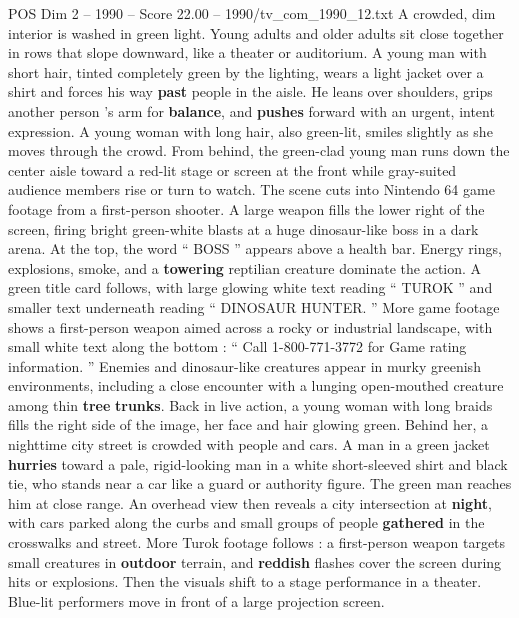 \begin{textsample}{POS Dim 2 – 1990 – Score 22.00 – 1990/tv\_com\_1990\_12.txt}  \label{ex:f2_pos_033}
A crowded, dim interior is washed in green light.
Young adults and older adults sit close together in rows that slope downward, like a theater or auditorium.
A young man with short hair, tinted completely green by the lighting, wears a light jacket over a shirt and forces his way \textbf{past} people in the aisle.
He leans over shoulders, grips another person ’s arm for \textbf{balance}, and \textbf{pushes} forward with an urgent, intent expression.
A young woman with long hair, also green-lit, smiles slightly as she moves through the crowd.
From behind, the green-clad young man runs down the center aisle toward a red-lit stage or screen at the front while gray-suited audience members rise or turn to watch.
The scene cuts into Nintendo 64 game footage from a first-person shooter.
A large weapon fills the lower right of the screen, firing bright green-white blasts at a huge dinosaur-like boss in a dark arena.
At the top, the word “ BOSS ” appears above a health bar.
Energy rings, explosions, smoke, and a \textbf{towering} reptilian creature dominate the action.
A green title card follows, with large glowing white text reading “ TUROK ” and smaller text underneath reading “ DINOSAUR HUNTER. ” More game footage shows a first-person weapon aimed across a rocky or industrial landscape, with small white text along the bottom : “ Call 1-800-771-3772 for Game rating information. ” Enemies and dinosaur-like creatures appear in murky greenish environments, including a close encounter with a lunging open-mouthed creature among thin \textbf{tree} \textbf{trunks}.
Back in live action, a young woman with long braids fills the right side of the image, her face and hair glowing green.
Behind her, a nighttime city street is crowded with people and cars.
A man in a green jacket \textbf{hurries} toward a pale, rigid-looking man in a white short-sleeved shirt and black tie, who stands near a car like a guard or authority figure.
The green man reaches him at close range.
An overhead view then reveals a city intersection at \textbf{night}, with cars parked along the curbs and small groups of people \textbf{gathered} in the crosswalks and street.
More Turok footage follows : a first-person weapon targets small creatures in \textbf{outdoor} terrain, and \textbf{reddish} flashes cover the screen during hits or explosions.
Then the visuals shift to a stage performance in a theater.
Blue-lit performers move in front of a large projection screen.

\end{textsample}
